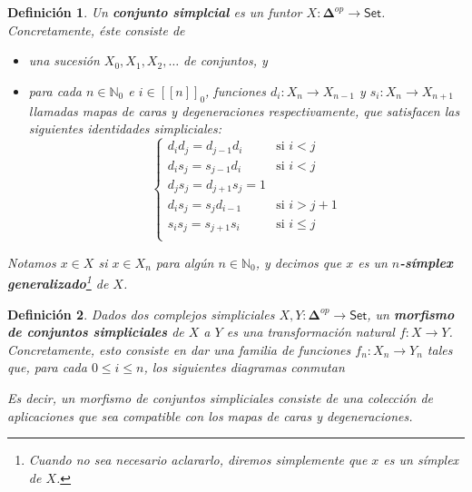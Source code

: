 \documentclass[11pt]{report}
\theoremstyle{colored}
\newtheorem{definition}{Definición}[section]
\newcommand{\N}{\mathbb{N}}
\newcommand{\nat}[1]{[\![#1]\!]}
\newcommand{\natzero}[1]{\nat{#1}_0}
\newcommand{\cat}[1]{\mathsf{#1}}
\newcommand{\ordcat}{\boldsymbol{\Delta}}
\begin{document}
\begin{definition} Un \textbf{conjunto simplcial} es un funtor $X : \ordcat^{op} \to \cat{Set}$. Concretamente, éste consiste de 
\begin{itemize}
\item[(i)] una sucesión $X_0,X_1,X_2, \dots$ de conjuntos, y \item[(ii)] para cada $n \in \N_0$ e $i \in \natzero{n}$, funciones 
$d_i : X_n \to X_{n-1}$ y $s_i : X_n \to X_{n+1}$ llamadas mapas de caras y degeneraciones respectivamente, que satisfacen las siguientes \textit{identidades simpliciales}:
\[
\begin{cases}
d_id_j = d_{j-1}d_i &\text{si $i < j$}\\
d_is_j = s_{j-1}d_i &\text{si $i < j$}\\
d_js_j = d_{j+1}s_j = 1\\
d_is_j = s_jd_{i-1} &\text{si $i > j+1$}\\
s_is_j = s_{j+1}s_i &\text{si $i \leq j$}\\
\end{cases}
\] 
\end{itemize}
Notamos $x \in X$ si $x \in X_n$ para algún $n \in \N_0$, y decimos que $x$ es un \textbf{$n$-símplex generalizado}\footnote{Cuando no sea necesario aclararlo, diremos simplemente que $x$ es un símplex de $X$.} de $X$.\\
\end{definition}

\begin{definition} Dados dos complejos simpliciales $X,Y : \ordcat^{op} \to \cat{Set}$, un \textbf{morfismo de conjuntos simpliciales} de $X$ a $Y$ es una transformación natural $f : X \to Y$. Concretamente, esto consiste en dar una familia de funciones $f_n : X_n \to Y_n$ tales que, para cada $0 \leq i \leq n$, los siguientes diagramas conmutan
\begin{center}
\end{center}

Es decir, un morfismo de conjuntos simpliciales consiste de una colección de aplicaciones que sea compatible con los mapas de caras y degeneraciones.
\end{definition}
\end{document}
